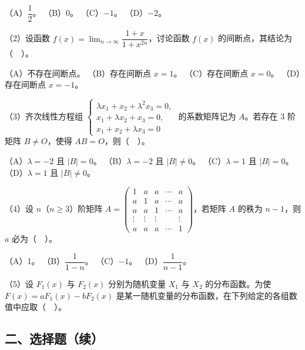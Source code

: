 \documentclass[UTF8,12pt]{ctexart}
\begin{document}
（A）\(\displaystyle \dfrac{\displaystyle 1}{\displaystyle 2}\)。 （B）0。 （C）\(\displaystyle -1\)。 （D）\(\displaystyle -2\)。


（2）设函数 \(\displaystyle f(x)=\displaystyle \lim_{n\to\infty}\dfrac{\displaystyle 1+x}{\displaystyle 1+x^{2n}}\)，讨论函数 \(\displaystyle f(x)\) 的间断点，其结论为（　）。


（A）不存在间断点。 （B）存在间断点 \(\displaystyle x=1\)。 （C）存在间断点 \(\displaystyle x=0\)。 （D）存在间断点 \(\displaystyle x=-1\)。


（3）齐次线性方程组 \(\displaystyle \begin{cases}\lambda x_1+x_2+\lambda^2x_3=0,\allowbreak \\x_1+\lambda x_2+x_3=0,\allowbreak \\x_1+x_2+\lambda x_3=0\end{cases}\) 的系数矩阵记为 \(\displaystyle A\)。若存在 3 阶矩阵 \(\displaystyle B\ne O\)，使得 \(\displaystyle AB=O\)，则（　）。


（A）\(\displaystyle \lambda=-2\) 且 \(\displaystyle |B|=0\)。 （B）\(\displaystyle \lambda=-2\) 且 \(\displaystyle |B|\ne0\)。 （C）\(\displaystyle \lambda=1\) 且 \(\displaystyle |B|=0\)。 （D）\(\displaystyle \lambda=1\) 且 \(\displaystyle |B|\ne0\)。


（4）设 \(\displaystyle n\)（\(\displaystyle n\geq3\)）阶矩阵 \(\displaystyle A=\begin{pmatrix}1&a&a&\cdots&a\\a&1&a&\cdots&a\\a&a&1&\cdots&a\\\vdots&\vdots&\vdots&&\vdots\\a&a&a&\cdots&1\end{pmatrix}\)，若矩阵 \(\displaystyle A\) 的秩为 \(\displaystyle n-1\)，则 \(\displaystyle a\) 必为（　）。


（A）1。 （B）\(\displaystyle \dfrac{\displaystyle 1}{\displaystyle 1-n}\)。 （C）\(\displaystyle -1\)。 （D）\(\displaystyle \dfrac{\displaystyle 1}{\displaystyle n-1}\)。


（5）设 \(\displaystyle F_1(x)\) 与 \(\displaystyle F_2(x)\) 分别为随机变量 \(\displaystyle X_1\) 与 \(\displaystyle X_2\) 的分布函数。为使 \(\displaystyle F(x)=aF_1(x)-bF_2(x)\) 是某一随机变量的分布函数，在下列给定的各组数值中应取（　）。


\subsection*{二、选择题（续）}
\end{document}
